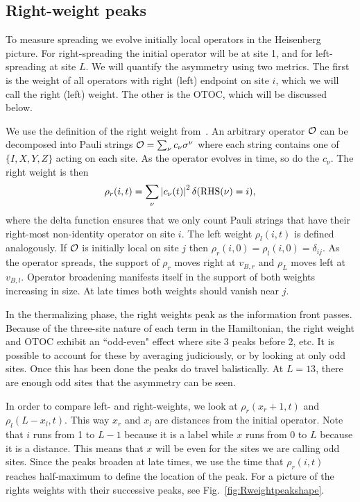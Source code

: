 \documentclass[aps,prx,reprint,superscriptaddress, longbibliography]{revtex4-1}
\begin{document}
\subsection{Right-weight peaks}

To measure spreading we evolve initially local operators in the Heisenberg picture. For right-spreading the initial operator will be at site 1, and for left-spreading at site $L$.
We will quantify the asymmetry using two metrics. The first is the weight of all operators with right (left) endpoint on site $i$, which we will call the right (left) weight. The other is the OTOC, which will be discussed below.

We use the definition of the right weight from~\cite{KeyserlingkHydro2017}. An arbitrary operator $\cal O$ can be decomposed into Pauli strings ${\cal O} = \sum_\nu c_\nu \sigma^\nu$ where each string contains one of $\{I, X, Y, Z\}$ acting on each site. As the operator evolves in time, so do the $c_\nu$. The right weight is then
\begin{align}
\rho_r(i,t) = \sum_\nu\left| c_\nu(t)\right|^2\delta(\text{RHS}(\nu) = i),
\end{align}
where the delta function ensures that we only count Pauli strings that have their right-most non-identity operator on site $i$. The left weight $\rho_l(i,t)$ is defined analogously.  If $\cal O$ is initially local on site $j$ then $\rho_r(i,0) = \rho_l(i,0) = \delta_{ij}$. As the operator spreads, the support of $\rho_r$ moves right at $v_{B,r}$ and $\rho_L$ moves left at $v_{B,l}$. Operator broadening manifests itself in the support of both weights increasing in size. At late times both weights should vanish near $j$.

In the thermalizing phase, the right weights peak as the information front passes. Because of the three-site nature of each term in the Hamiltonian, the right weight and OTOC exhibit an ``odd-even" effect where site 3 peaks before 2, etc. It is possible to account for these by averaging judiciously, or by  looking at only odd sites.  Once this has been done the peaks do travel balistically. At $L=13$, there are enough odd sites that the asymmetry can be seen. 

In order to compare left- and right-weights, we look at  $\rho_r(x_r+1,t)$ and $\rho_l(L-x_l,t)$. This way $x_{r}$ and $x_l$ are distances from the initial operator. Note that $i$ runs from 1 to $L-1$ because it is a label while $x$ runs from 0 to $L$ because it is a distance. This means that $x$ will be even for the sites we are calling odd sites.
Since the peaks broaden at late times, we use the time that $\rho_r(i,t)$ reaches half-maximum to define the location of the peak.
For a picture of the rights weights with their successive peaks, see Fig.~\ref{fig:Rweightpeakshape}.
\end{document}

